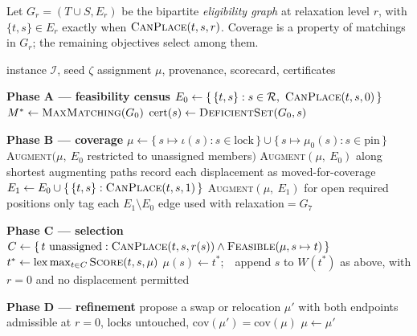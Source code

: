 \documentclass[11pt,a4paper]{article}
\DeclareMathOperator*{\lexmax}{lex\,max}
\theoremstyle{definition}
\theoremstyle{remark}
\newcommand{\canplace}{\textsc{CanPlace}}
\newcommand{\score}{\textsc{Score}}
\newcommand{\nightsolve}{\textsc{NightSolve}}
\newcommand{\lex}{\succ_{\mathrm{lex}}}
\begin{document}
Let $G_r = (T \cup S, E_r)$ be the bipartite \emph{eligibility graph} at
relaxation level $r$, with $\{t,s\} \in E_r$ exactly when
$\canplace(t,s,r)$. Coverage is a property of matchings in $G_r$; the
remaining objectives select among them.

\begin{algorithm}[htbp]
\caption{$\nightsolve(\mathcal{I}, \zeta)$}
\label{alg:night}
\begin{algorithmic}[1]
\Require instance $\mathcal{I}$, seed $\zeta$
\Ensure assignment $\mu$, provenance, scorecard, certificates

\Statex \textbf{Phase A --- feasibility census}
\State $E_0 \gets \{\, \{t,s\} : s \in \mathcal{R},\ \canplace(t,s,0) \,\}$
\State $M^{*} \gets \textsc{MaxMatching}(G_0)$
  \State $\mathrm{cert}(s) \gets \textsc{DeficientSet}(G_0, s)$
\EndFor

\Statex \textbf{Phase B --- coverage}
\State $\mu \gets \{\, s \mapsto \iota(s) : s \in \mathrm{lock} \,\} \cup
        \{\, s \mapsto \mu_0(s) : s \in \mathrm{pin} \,\}$
\State \textsc{Augment}$(\mu,\ E_0$ restricted to unassigned members$)$
  \State \textsc{Augment}$(\mu,\ E_0)$ along shortest augmenting paths
  \State record each displacement as \textsf{moved-for-coverage}
\EndIf
{}
  \State $E_1 \gets E_0 \cup \{\, \{t,s\} : \canplace(t,s,1) \,\}$
  \State \textsc{Augment}$(\mu,\ E_1)$ for open required positions only
  \State tag each $E_1 \setminus E_0$ edge used with
         \textsf{relaxation}$=G_7$
\EndIf

\Statex \textbf{Phase C --- selection}
  \State $C \gets \{\, t \text{ unassigned} : \canplace(t,s,r(s))
          \wedge \textsc{Feasible}(\mu, s \mapsto t) \,\}$
  \State $t^{*} \gets \lexmax_{t \in C} \score(t, s, \mu)$
  \State $\mu(s) \gets t^{*}$;\ \ append $s$ to $W(t^{*})$
\EndFor
{}
  \State as above, with $r = 0$ and no displacement permitted
\EndFor

\Statex \textbf{Phase D --- refinement}
  \State propose a swap or relocation $\mu'$ with both endpoints admissible
         at $r = 0$, locks untouched, $\mathrm{cov}(\mu') =
         \mathrm{cov}(\mu)$
  \If{$\Sigma\score(\mu') \lex \Sigma\score(\mu)$}
    \State $\mu \gets \mu'$
  \EndIf
\EndFor


\end{algorithmic}
\end{algorithm}
\end{document}
